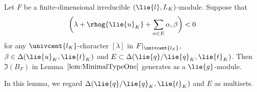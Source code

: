\begin{Lemma}\label{lem:CyclicSubspace}
	Let $F$ be a finite-dimensional irreducible $(\lie{l}, L_K)$-module.
	Suppose that
 \[
 \biggl(\lambda +\rhog{\lie{u}_K} + \sum_{\alpha \in E}\alpha, \beta\biggr) < 0
 \]
	for any $\univcent{l_\mathit{K}}$-character $[\lambda]$ in $F|_{\univcent{l_{\mathit{K}}}}$, $\beta \in \Delta(\lie{u}_K, \lie{t}_K)$ and $E \subset \Delta(\lie{q}/\lie{q}_K, \lie{t}_K)$.
	Then $\Im(B_F)$ in Lemma~$\ref{lem:MinimalTypeOne}$ generates  as a $\lie{g}$-module.
\end{Lemma}

\begin{Remark}
	In this lemma, we regard $\Delta(\lie{q}/\lie{q}_K, \lie{t}_K)$ and $E$ as multisets.
\end{Remark}


